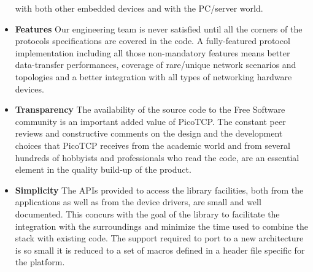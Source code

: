 \begin{itemize}
with both other embedded devices and with the PC/server world.
\item \textbf{Features} Our engineering team is never satisfied until all
the corners of the protocols specifications are covered in the code.
A fully-featured protocol implementation including all those non-mandatory
features means better data-transfer performances, coverage of rare/unique 
network scenarios and topologies and a better integration with all types of
networking hardware devices.
\item \textbf{Transparency} The availability of the source code to the Free
Software community is an important added value of PicoTCP. 
The constant peer reviews and constructive comments on the
design and the development choices that PicoTCP receives from the academic world
and from several hundreds of hobbyists and  professionals who read the code,
are an essential element in the quality build-up of the product.
\item \textbf{Simplicity} The APIs provided to access the library
facilities, both from the applications as well as from the device drivers, are
small and well documented. This concurs with the goal of the library to facilitate
the integration with the surroundings and minimize the time used to combine
the stack with existing code. The support required to port to a new
architecture is so small it is reduced to a set of macros defined in a
header file specific for the platform.
\end{itemize}


